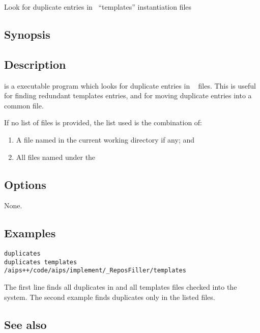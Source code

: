 Look for duplicate entries in \aipspp\ ``templates'' instantiation files
 
\subsection*{Synopsis}
 
\begin{synopsis}
\end{synopsis}
 
\subsection*{Description}
 
 is a  executable program which looks for duplicate 
entries in \aipspp\  files. This is useful for finding redundant
templates entries, and for moving duplicate entries into a common 
 file.
 
If no list of files is provided, the list used is the combination of:
\begin{enumerate}
	\item A file named  in the current working directory
              if any; and
	\item All files named  under the
\end{enumerate}

 
\subsection*{Options}
 
None.
 
\subsection*{Examples}
 
\begin{verbatim}
duplicates
duplicates templates /aips++/code/aips/implement/_ReposFiller/templates
\end{verbatim}

The first line finds all duplicates in  and all templates 
files checked into the system. The second example finds duplicates only in
the listed files.
 
\subsection*{See also}
 
